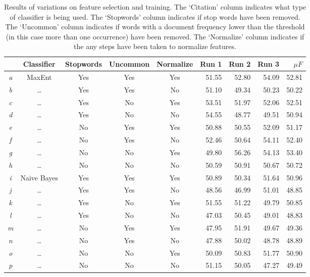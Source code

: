 \documentclass[12pt]{article}
\begin{document}
\begin{table}[H]
    \begin{center}
    \begin{tabular}{|c||c|c|c|c|r|r|r|r|}
        \hline
                   & Classifier  & Stopwords & Uncommon  & Normalize & Run 1 & Run 2 & Run 3 & $\mu F$\\
        \hline
        \textit{a} & MaxEnt      & Yes       & Yes       & Yes       & 51.55 & 52.80 & 54.09 & 52.81 \\
        \textit{b} & \dots       & Yes       & Yes       & No        & 51.10 & 49.34 & 50.23 & 50.22 \\
        \textit{c} & \dots       & Yes       & No        & Yes       & 53.51 & 51.97 & 52.06 & 52.51 \\
        \textit{d} & \dots       & Yes       & No        & No        & 54.55 & 48.77 & 49.51 & 50.94 \\
        \textit{e} & \dots       & No        & Yes       & Yes       & 50.88 & 50.55 & 52.09 & 51.17 \\
        \textit{f} & \dots       & No        & Yes       & No        & 52.46 & 50.64 & 54.11 & 52.40 \\
        \textit{g} & \dots       & No        & No        & Yes       & 49.80 & 56.26 & 54.13 & 53.40 \\
        \textit{h} & \dots       & No        & No        & No        & 50.59 & 50.91 & 50.67 & 50.72 \\
        \textit{i} & Naive Bayes & Yes       & Yes       & Yes       & 50.89 & 50.34 & 51.64 & 50.96 \\
        \textit{j} & \dots       & Yes       & Yes       & No        & 48.56 & 46.99 & 51.01 & 48.85 \\
        \textit{k} & \dots       & Yes       & No        & Yes       & 51.55 & 51.22 & 49.79 & 50.85 \\
        \textit{l} & \dots       & Yes       & No        & No        & 47.03 & 50.45 & 49.01 & 48.83 \\
        \textit{m} & \dots       & No        & Yes       & Yes       & 47.95 & 51.91 & 49.67 & 49.36 \\
        \textit{n} & \dots       & No        & Yes       & No        & 47.88 & 50.02 & 48.78 & 48.89 \\
        \textit{o} & \dots       & No        & No        & Yes       & 50.09 & 50.83 & 51.77 & 50.90 \\
        \textit{p} & \dots       & No        & No        & No        & 51.15 & 50.05 & 47.27 & 49.49 \\
        \hline
    \end{tabular}
    \end{center}
    \caption{Results of variations on feature selection and training. The
    `Citation' column indicates what type of classifier is being used. The
    `Stopwords' column indicates if stop words have been removed. The `Uncommon'
    column indicates if words with a document frequency lower than the threshold
    (in this case more than one occurrence) have been removed. The `Normalize'
    column indicates if the any steps have been taken to normalize features.}
    \label{table:results}
\end{table}
\end{document}
